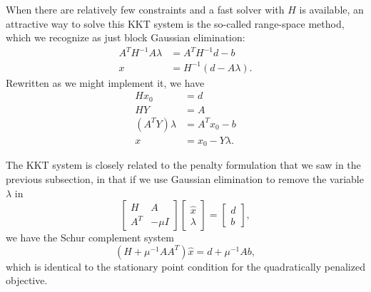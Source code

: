 \documentclass[12pt, leqno]{article} %
\begin{document}
When there are relatively few constraints and a fast solver with \(H\)
is available, an attractive way to solve this KKT system is the
so-called range-space method, which we recognize as just block Gaussian
elimination: \begin{align*}
  A^T H^{-1} A \lambda &= A^T H^{-1} d - b \\
  x &= H^{-1} (d - A\lambda).
\end{align*} Rewritten as we might implement it, we have \begin{align*}
  H x_0 &= d \\
  H Y   &= A \\
  (A^T Y) \lambda &= A^T x_0 - b \\
  x &= x_0 - Y \lambda.
\end{align*}

The KKT system is closely related to the penalty formulation that we saw
in the previous subsection, in that if we use Gaussian elimination to
remove the variable \(\lambda\) in \[\begin{bmatrix}
    H & A \\
    A^T & -\mu I
  \end{bmatrix}
  \begin{bmatrix} \hat{x} \\ \lambda \end{bmatrix} =
  \begin{bmatrix} d \\ b \end{bmatrix},\] we have the Schur complement
system \[(H+\mu^{-1} AA^T) \hat{x} = d + \mu^{-1} A b,\] which is
identical to the stationary point condition for the quadratically
penalized objective.
\end{document}
